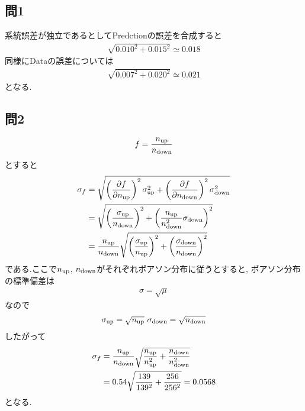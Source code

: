 \documentclass[uplatex,a4j,11pt,dvipdfmx]{jsarticle}
\begin{document}
\title{}
\author{61908697 佐々木良輔}
\date{}
\maketitle
\subsection*{問1}
系統誤差が独立であるとしてPredctionの誤差を合成すると
\begin{align}
  \sqrt{0.010^2+0.015^2}\simeq0.018
\end{align}
同様にDataの誤差については
\begin{align}
  \sqrt{0.007^2+0.020^2}\simeq0.021
\end{align}
となる.
\subsection*{問2}
\begin{align}
  f=\frac{n_{\rm up}}{n_{\rm down}}
\end{align}
とすると
\begin{align}
  \begin{split}
    \sigma_f&=\sqrt{\left(\frac{\partial f}{\partial n_{\rm up}}\right)^2\sigma_{\rm up}^2+
    \left(\frac{\partial f}{\partial n_{\rm down}}\right)^2\sigma_{\rm down}^2}\\
    &=\sqrt{\left(\frac{\sigma_{\rm up}}{n_{\rm down}}\right)^2+\left(\frac{n_{\rm up}}{n_{\rm down}^2}\sigma_{\rm down}\right)^2}\\
    &=\frac{n_{\rm up}}{n_{\rm down}}\sqrt{\left(\frac{\sigma_{\rm up}}{n_{\rm up}}\right)^2+\left(\frac{\sigma_{\rm down}}{n_{\rm down}}\right)^2}
  \end{split}
\end{align}
である.ここで$n_{\rm up}$, $n_{\rm down}$がそれぞれポアソン分布に従うとすると,
ポアソン分布の標準偏差は
\begin{align}
  \sigma=\sqrt{\mu}
\end{align}
なので
\begin{align}
  \sigma_{\rm up}=\sqrt{n_{\rm up}}\ \sigma_{\rm down}=\sqrt{n_{\rm down}}
\end{align}
したがって
\begin{align}
  \sigma_f&=\frac{n_{\rm up}}{n_{\rm down}}\sqrt{\frac{n_{\rm up}}{n_{\rm up}^2}+\frac{n_{\rm down}}{n_{\rm down}^2}}\\
  &=0.54\sqrt{\frac{139}{139^2}+\frac{256}{256^2}}=0.0568
\end{align}
となる.
\end{document}
